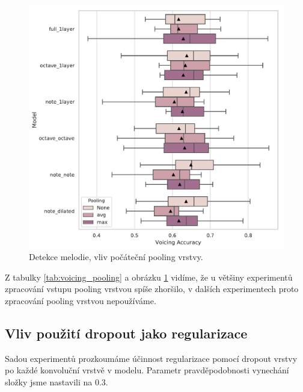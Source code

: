 \begin{figure}[h]\centering
    \includegraphics[scale=0.6]{../img/figures/voicing_pooling}
\caption{Detekce melodie, vliv počáteční pooling vrstvy.}\label{obr:voicing_pooling}
\end{figure}

Z tabulky \ref{tab:voicing_pooling} a obrázku \ref{obr:voicing_pooling} vidíme, že u většiny experimentů zpracování vstupu pooling vrstvou spíše zhoršilo, v dalších experimentech proto zpracování pooling vrstvou nepoužíváme.

\subsection{Vliv použití dropout jako regularizace}

Sadou experimentů prozkoumáme účinnost regularizace pomocí dropout vrstvy po každé konvoluční vrstvě v modelu. Parametr pravděpodobnosti vynechání složky jsme nastavili na $0.3$. 

